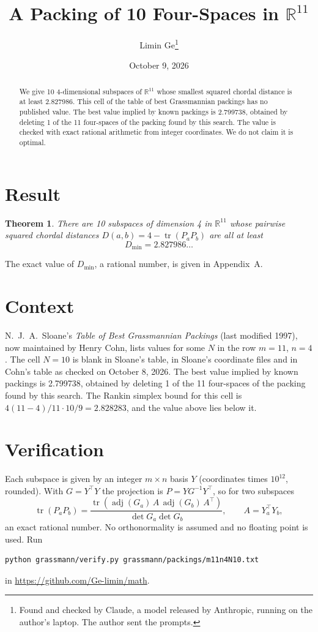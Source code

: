 \documentclass[11pt,a4paper]{article}
\title{A Packing of 10 Four-Spaces in $\mathbb{R}^{11}$}
\author{Limin Ge\thanks{Found and checked by Claude, a model released by Anthropic, running on the author's laptop. The author sent the prompts.}}
\date{October 9, 2026}
\newtheorem*{theorem}{Theorem}
\begin{document}
\maketitle
\begin{abstract}
We give 10 4-dimensional subspaces of $\mathbb{R}^{11}$ whose smallest squared chordal distance is at least 2.827986. This cell of the table of best Grassmannian packings has no published value. The best value implied by known packings is 2.799738, obtained by deleting 1 of the 11 four-spaces of the packing found by this search. The value is checked with exact rational arithmetic from integer coordinates. We do not claim it is optimal.
\end{abstract}

\section{Result}
\begin{theorem}
There are 10 subspaces of dimension 4 in $\mathbb{R}^{11}$ whose pairwise squared chordal distances $D(a,b) = 4 - \operatorname{tr}(P_aP_b)$ are all at least
\[ D_{\min} = 2.827986\ldots \]
\end{theorem}
The exact value of $D_{\min}$, a rational number, is given in Appendix~A.


\section{Context}
N.~J.~A.~Sloane's \emph{Table of Best Grassmannian Packings} (last modified 1997), now maintained by Henry Cohn, lists values for some $N$ in the row $m=11$, $n=4$. The cell $N=10$ is blank in Sloane's table, in Sloane's coordinate files and in Cohn's table as checked on October 8, 2026. The best value implied by known packings is 2.799738, obtained by deleting 1 of the 11 four-spaces of the packing found by this search. The Rankin simplex bound for this cell is $4(11-4)/11\cdot 10/9 = 2.828283$, and the value above lies below it.


\section{Verification}
Each subspace is given by an integer $m\times n$ basis $Y$ (coordinates times $10^{12}$, rounded). With $G=Y^\top Y$ the projection is $P=YG^{-1}Y^\top$, so for two subspaces
\[ \operatorname{tr}(P_aP_b)=\frac{\operatorname{tr}(\operatorname{adj}(G_a)\,A\,\operatorname{adj}(G_b)\,A^\top)}{\det G_a\det G_b},\qquad A=Y_a^\top Y_b, \]
an exact rational number. No orthonormality is assumed and no floating point is used. Run
\begin{verbatim}
python grassmann/verify.py grassmann/packings/m11n4N10.txt
\end{verbatim}
in \url{https://github.com/Ge-limin/math}.
\end{document}

